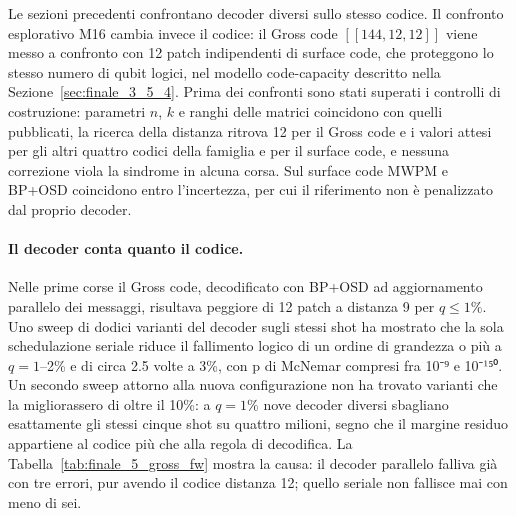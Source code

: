 Le sezioni precedenti confrontano decoder diversi sullo stesso codice. Il confronto esplorativo M16 cambia invece il codice: il Gross code \ensuremath{[[144,12,12]]} \cite{bravyi2024} viene messo a confronto con 12 patch indipendenti di surface code, che proteggono lo stesso numero di qubit logici, nel modello code-capacity descritto nella Sezione~\ref{sec:finale_3_5_4}. Prima dei confronti sono stati superati i controlli di costruzione: parametri \(n\), \(k\) e ranghi delle matrici coincidono con quelli pubblicati, la ricerca della distanza ritrova 12 per il Gross code e i valori attesi per gli altri quattro codici della famiglia e per il surface code, e nessuna correzione viola la sindrome in alcuna corsa. Sul surface code MWPM e BP+OSD coincidono entro l'incertezza, per cui il riferimento non è penalizzato dal proprio decoder.

\paragraph{Il decoder conta quanto il codice.} Nelle prime corse il Gross code, decodificato con BP+OSD ad aggiornamento parallelo dei messaggi, risultava peggiore di 12 patch a distanza 9 per \(q \le 1\%\). Uno sweep di dodici varianti del decoder sugli stessi shot ha mostrato che la sola schedulazione seriale riduce il fallimento logico di un ordine di grandezza o più a \(q = 1\)--2\% e di circa 2.5 volte a 3\%, con p di McNemar compresi fra 10⁻⁹ e 10⁻¹⁵⁰. Un secondo sweep attorno alla nuova configurazione non ha trovato varianti che la migliorassero di oltre il 10\%: a \(q = 1\%\) nove decoder diversi sbagliano esattamente gli stessi cinque shot su quattro milioni, segno che il margine residuo appartiene al codice più che alla regola di decodifica. La Tabella~\ref{tab:finale_5_gross_fw} mostra la causa: il decoder parallelo falliva già con tre errori, pur avendo il codice distanza 12; quello seriale non fallisce mai con meno di sei.

